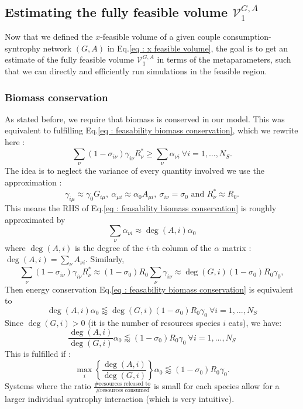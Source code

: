 \documentclass[12pt, titlepage]{report}
\begin{document}
\subsection{Estimating the fully feasible volume $\mathcal{V}^{G,A}_1$}
Now that we defined the $x$-feasible volume of a given couple consumption-syntrophy network $(G,A)$ in Eq.\eqref{eq : x feasible volume}, the goal is to get an estimate of the fully feasible volume $\mathcal{V}^{G,A}_1$ in terms of the metaparameters, such that we can directly and efficiently run simulations in the feasible region.
\subsubsection{Biomass conservation}
As stated before, we require that biomass is conserved in our model. This was equivalent to fulfilling Eq.\eqref{eq : feasability biomass conservation}, which we rewrite here :
\begin{equation}
\sum_\nu \left(1-\sigma_{i\nu}\right)\gamma_{i\nu}R^*_\nu \geq \sum_\nu \alpha_{\nu i} \ \forall i=1,\dots, N_S.
\end{equation}
The idea is to neglect the variance of every quantity involved \ie we use the approximation :
\begin{equation}
\gamma_{i\mu} \approx \gamma_0 G_{i\mu}, \ \alpha_{\mu i}\approx \alpha_0 A_{\mu i}, \ \sigma_{i\nu} = \sigma_0 \text{ and }R^*_\nu \approx R_0.
\end{equation}
This means the RHS of Eq.\eqref{eq : feasability biomass conservation} is roughly approximated by
\begin{equation}
\sum_\nu \alpha_{\nu i} \approx \deg(A, i) \alpha_0
\end{equation}
where $\deg(A,i)$ is the degree of the $i$-th column of the $\alpha$ matrix : $\deg(A, i) = \sum_\nu A_{\nu i}$.
Similarly,
\begin{equation}
\sum_\nu \left(1-\sigma_{i\nu}\right)\gamma_{i\nu} R^*_\nu \approx (1-\sigma_0)R_0\sum_{\nu}\gamma_{i\nu} \approx \deg(G, i)(1-\sigma_0)R_0\gamma_0,
\end{equation}
Then energy conservation Eq.\eqref{eq : feasability biomass conservation} is equivalent to
\begin{equation}
\deg(A,i) \alpha_0 \lessapprox \deg(G,i) (1-\sigma_0)R_0\gamma_0 \ \forall i=1,...,N_S
\end{equation}
Since $\deg(G,i) > 0 $ (it is the number of resources species $i$ eats), we have:
\begin{equation}
\frac{\deg(A,i)}{\deg(G,i)} \alpha_0 \lessapprox (1-\sigma_0)R_0\gamma_0 \ \forall i=1,...,N_S
\end{equation}
This is fulfilled if :
\begin{equation}\label{eq: feasability energy conservation}
\boxed{
\max_i\left\{\frac{\deg(A,i)}{\deg(G,i)}\right\} \alpha_0 \lessapprox (1-\sigma_0)R_0 \gamma_0
}.
\end{equation}
  Systems where the ratio $\frac{\# \text{resources released to}}{\# \text{resources consumed}}$ is small for each species allow for a larger individual syntrophy interaction (which is very intuitive).
\end{document}
